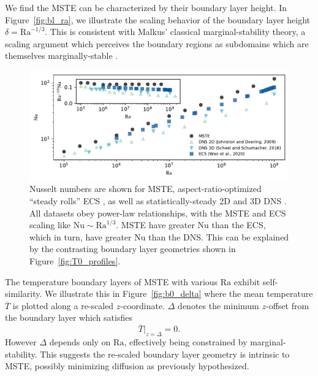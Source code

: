 \documentclass[reprint,amsmath,amssymb,aps,nofootinbib]{revtex4-1}
\newcommand\Ra{\mathrm{Ra}}
\newcommand\Nu{\mathrm{Nu}}
\begin{document}
We find the MSTE can be characterized by their boundary layer height.
In Figure~\ref{fig:bl_ra}, we illustrate the scaling behavior of the boundary layer height $\delta = \Ra^{-1/3}$. 
This is consistent with Malkus' classical marginal-stability theory, a scaling argument which perceives the boundary regions as subdomains which are themselves marginally-stable \cite{Malkus_1954}.

\begin{figure}
    \centering
    \includegraphics[width=7.1in]{nu_ra.pdf}
    \caption{Nusselt numbers are shown for MSTE, aspect-ratio-optimized ``steady rolls'' ECS \cite{Wen}, as well as statistically-steady 2D and 3D DNS \cite{Johnston, Scheel_2016}.
    All datasets obey power-law relationships, with the MSTE and ECS scaling like $\Nu \sim\Ra^{1/3}$. 
    MSTE have greater $\Nu$ than the ECS, which in turn, have greater $\Nu$ than the DNS. 
    This can be explained by the contrasting boundary layer geometries shown in Figure~\ref{fig:T0_profiles}.}%
    \label{fig:nu_vs_ra}%
\end{figure}


The temperature boundary layers of MSTE with various $\Ra$ exhibit self-similarity. 
We illustrate this in Figure~\ref{fig:b0_delta} where the mean temperature $\overline{T}$ is plotted along a re-scaled $z$-coordinate.
$\Delta$ denotes the minimum $z$-offset from the boundary layer which satisfies
\begin{equation*}
    \overline{T}|_{z = \Delta} = 0.
\end{equation*}
However $\Delta$ depends only on $\Ra$, effectively being constrained by marginal-stability.
This suggests the re-scaled boundary layer geometry is intrinsic to MSTE, possibly minimizing diffusion as previously hypothesized.
\end{document}
